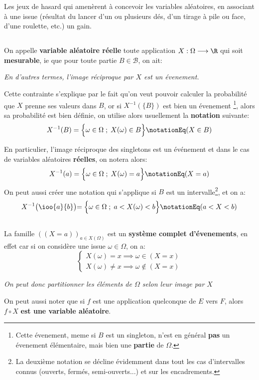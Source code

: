 Les jeux de hasard qui amenèrent à concevoir les variables aléatoires, en associant à une issue (résultat du lancer d'un ou plusieurs dés, d'un tirage à pile ou face, d'une roulette, etc.) un gain.

\subsection*{}
On appelle \textbf{variable aléatoire réelle} toute application \(X: \Omega \longrightarrow \R\) qui soit \textbf{mesurable}, ie que pour toute partie \(B \in \mathscr{B}\), on ait:
\begin{center}
   \textit{En d'autres termes, l'image réciproque par \(X\) est un évenement.}
\end{center}
Cette contrainte s'explique par le fait qu'on veut pouvoir calculer la probabilité que \(X\) prenne ses valeurs dans \(B\), or si \(X^{-1}(\{B\})\) est bien un évenement \footnote[1]{Cette évenement, meme si \(B\) est un singleton, n'est en général \textbf{pas} un évenement élémentaire, mais bien une \textbf{partie} de \(\Omega\).}, alors sa probabilité est bien définie, on utilise alors usuellement la \textbf{notation} suivante:
\[
   X^{-1}(B) = \Bigl\{ \omega \in \Omega \; ; \;  X(\omega) \in B \Bigl\} \notationEq (X \in B)  
\]

En particulier, l'image réciproque des singletons est un événement et dans le cas de variables aléatoires \textbf{réelles}, on notera alors:
\[
   X^{-1}(a) = \Bigl\{ \omega \in \Omega \; ; \;  X(\omega) = a\Bigl\} \notationEq (X = a) \\
\] 
On peut aussi créer une notation qui s'applique si \(B\) est un intervalle\footnote[2]{La deuxième notation se décline évidemment dans tout les cas d'intervalles connus (ouverts, fermés, semi-ouverts...) et sur les encadrements.}, et on a:
\[
   X^{-1}\bigl(\ioo{a}{b}\bigl) = \Bigl\{ \omega \in \Omega \; ; \;  a < X(\omega) < b\Bigl\} \notationEq (a < X < b)
\]

\subsection*{}
La famille \(((X = a))_{a \in X(\Omega)}\) est un \textbf{système complet d'évenements}, en effet car si on considère une issue \(\omega \in \Omega\), on a:
\[
   \begin{cases}
      X(\omega) = x \implies \omega \in (X = x)\\  
      X(\omega) \neq x \implies \omega \notin (X = x)   
   \end{cases} 
\]
\begin{center}
   \textit{On peut donc partitionner les éléments de \(\Omega\) selon leur image par \(X\)}
\end{center}
On peut aussi noter que si \(f\) est une application quelconque de \(E\) vers \(F\), alors \(f \circ X\) \textbf{est une variable aléatoire}.
\pagebreak


